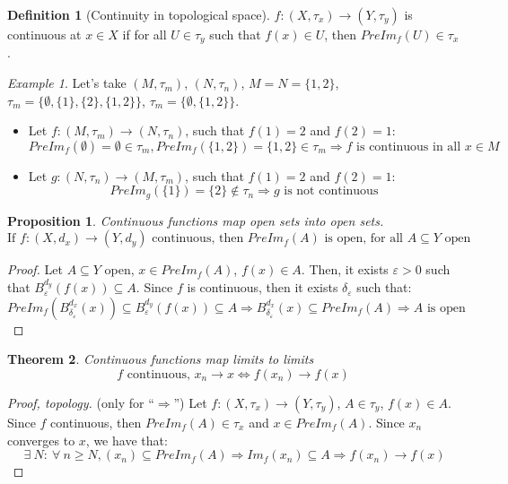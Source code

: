 \documentclass{article}
\newcommand{\Ar}{\Rightarrow}
\newcommand{\f}[3]{#1 : #2 \rightarrow #3}
\theoremstyle{definition}
\newtheorem{definition}{Definition}[section]
\theoremstyle{definition}
\theoremstyle{plain}
\newtheorem{theorem}{Theorem}[section]
\theoremstyle{plain}
\theoremstyle{plain}
\theoremstyle{plain}
\newtheorem{proposition}[theorem]{Proposition}
\theoremstyle{definition}
\theoremstyle{remark}
\newtheorem{exampled}{Example}[definition]
\theoremstyle{remark}
\theoremstyle{remark}
\theoremstyle{remark}
\newcommand{\ForAll}{\ \forall \ }
\newcommand{\Exists}{\ \exists \ }
\newcommand{\E}{\varepsilon}
\begin{document}
\begin{definition}[Continuity in topological space]
  $\f{f}{(X,\tau_x)}{(Y,\tau_y)}$ is continuous at $x \in X$ if for all $U \in \tau_y$ such that $f(x) \in U$, then $PreIm_f(U) \in \tau_x$.
\end{definition}

\begin{exampled}
  Let's take $(M,\tau_m)$, $(N,\tau_n)$, $M = N = \{ 1, 2 \}$, $\tau_m = \{ \emptyset, \{ 1 \}, \{ 2 \}, \{ 1, 2 \} \}$, $\tau_m = \{ \emptyset, \{ 1, 2 \} \}$.
  \begin{itemize}
    \item Let $\f{f}{(M,\tau_m)}{(N,\tau_n)}$, such that $f(1) = 2$ and $f(2) = 1$:
    \[
      PreIm_f(\emptyset) = \emptyset \in \tau_m,
      PreIm_f(\{ 1, 2 \}) = \{ 1, 2 \} \in \tau_m \Ar
      f \text{ is continuous in all } x \in M
    \]
    \item Let $\f{g}{(N,\tau_n)}{(M,\tau_m)}$, such that $f(1) = 2$ and $f(2) = 1$:
    \[
      PreIm_g(\{ 1 \}) = \{ 2 \} \notin \tau_n \Ar g \text{ is not continuous}
    \]
  \end{itemize}
\end{exampled}


\begin{proposition}
  Continuous functions map open sets into open sets.
  \[
  \text{If } \f{f}{(X,d_x)}{(Y,d_y)} \text{ continuous, then } PreIm_f(A) \text{ is open, for all } A \subseteq Y \text{ open}
  \]
\end{proposition}

\begin{proof}
  Let $A \subseteq Y$ open, $x \in PreIm_f(A)$, $f(x) \in A$. Then, it exists $\E > 0$ such that $B_\E^{d_y}(f(x)) \subseteq A$. Since $f$ is continuous, then it exists $\delta_\E$ such that:
  \[
    PreIm_f(B_{\delta_\E}^{d_x}(x)) \subseteq B_\E^{d_y}(f(x))
    \subseteq A \Ar B_{\delta_\E}^{d_x}(x) \subseteq PreIm_f(A)
    \Ar A \text{ is open}
  \]
\end{proof}


\begin{theorem}
  Continuous functions map limits to limits
  \[
    f \text{ continuous, } x_n \to x \iff f(x_n) \to f(x)
  \]
\end{theorem}

\begin{proof}[Proof, topology]
  (only for ``$\Ar$'') Let $\f{f}{(X,\tau_x)}{(Y,\tau_y)}$, $A \in \tau_y$, $f(x) \in A$. Since $f$ continuous, then $PreIm_f(A) \in \tau_x$ and $x \in PreIm_f(A)$. Since $x_n$ converges to $x$, we have that:
  \[
    \Exists N : \ForAll n \geq N, (x_n) \subseteq PreIm_f(A) \Ar
    Im_f(x_n) \subseteq A \Ar f(x_n) \to f(x)
  \]
\end{proof}
\end{document}
